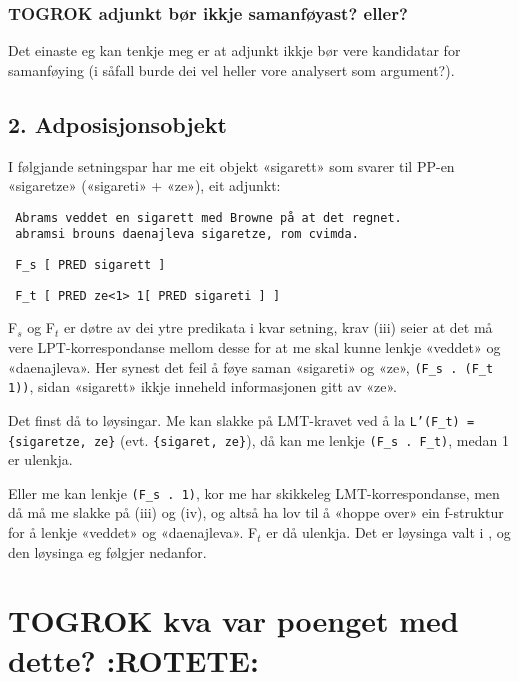 \documentclass[11pt,a4paper,oneside,draft]{book}
\begin{document}
\subsubsection{\textbf{TOGROK} adjunkt bør ikkje samanføyast? eller?}
\label{sec-3.13.1.1}

Det einaste eg kan
tenkje meg er at adjunkt ikkje bør vere kandidatar for samanføying (i
såfall burde dei vel heller vore analysert som argument?).

\subsection{2. Adposisjonsobjekt}
\label{sec-3.13.2}


I følgjande setningspar har me eit objekt «sigarett» som svarer til
PP-en «sigaretze» («sigareti» + «ze»), eit adjunkt:

\begin{verbatim}
 Abrams veddet en sigarett med Browne på at det regnet.
 abramsi brouns daenajleva sigaretze, rom cvimda.
\end{verbatim}


\begin{verbatim}
 F_s [ PRED sigarett ]
\end{verbatim}


\begin{verbatim}
 F_t [ PRED ze<1> 1[ PRED sigareti ] ]
\end{verbatim}


F$_s$ og F$_t$ er døtre av dei ytre predikata i kvar setning, krav (iii)
seier at det må vere LPT-korrespondanse mellom desse for at me skal
kunne lenkje «veddet» og «daenajleva».  Her synest det feil å føye
saman «sigareti» og «ze», \texttt{(F\_s . (F\_t 1))}, sidan «sigarett» ikkje
inneheld informasjonen gitt av «ze».

Det finst då to løysingar. Me kan slakke på LMT-kravet ved å la
\texttt{L'(F\_t) = \{sigaretze, ze\}} (evt. \texttt{\{sigaret, ze\}}), då kan me lenkje
\texttt{(F\_s . F\_t)}, medan 1 er ulenkja.

Eller me kan lenkje \texttt{(F\_s . 1)}, kor me har skikkeleg
LMT-korrespondanse, men då må me slakke på (iii) og (iv), og altså ha
lov til å «hoppe over» ein f-struktur for å lenkje «veddet» og
«daenajleva». F$_t$ er då ulenkja. Det er løysinga valt i
\citet[s.~75,~fotnote~3]{dyvik2009lmp}, og den løysinga eg følgjer
nedanfor.

\section{\textbf{TOGROK} kva var poenget med dette? \textbf{:ROTETE:}}
\label{sec-3.14}
\end{document}
